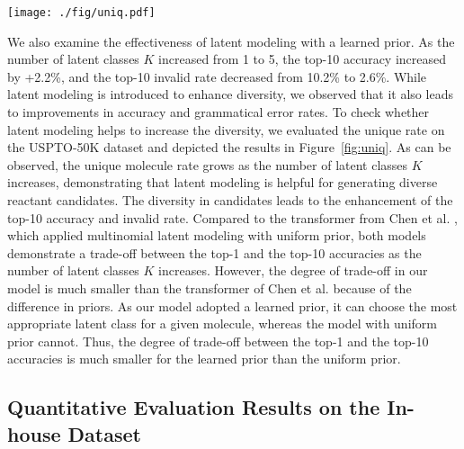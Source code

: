 \documentclass[journal=jacsat,manuscript=article]{achemso}
\begin{document}
	\begin{figure*}
	\centering
	\texttt{[image: ./fig/uniq.pdf]}
	\caption{Unique rate evaluation on the USPTO-50K dataset (unit: \%).}
	\label{fig:uniq}
	\end{figure*}
	
	We also examine the effectiveness of latent modeling with a learned prior. As the number of latent classes $K$ increased from 1 to 5, the top-10 accuracy increased by +2.2\%, and the top-10 invalid rate decreased from 10.2\% to 2.6\%. While latent modeling is introduced to enhance diversity, we observed that it also leads to improvements in accuracy and grammatical error rates. To check whether latent modeling helps to increase the diversity, we evaluated the unique rate on the USPTO-50K dataset and depicted the results in Figure~\ref{fig:uniq}. As can be observed, the unique molecule rate grows as the number of latent classes $K$ increases, demonstrating that latent modeling is helpful for generating diverse reactant candidates. The diversity in candidates leads to the enhancement of the top-10 accuracy and invalid rate. Compared to the transformer from Chen et al. \cite{chen2019learning}, which applied multinomial latent modeling with uniform prior, both models demonstrate a trade-off between the top-1 and the top-10 accuracies as the number of latent classes $K$ increases. However, the degree of trade-off in our model is much smaller than the transformer of Chen et al. because of the difference in priors. As our model adopted a learned prior, it can choose the most appropriate latent class for a given molecule, whereas the model with uniform prior cannot. Thus, the degree of trade-off between the top-1 and the top-10 accuracies is much smaller for the learned prior than the uniform prior.
	

	\subsection{Quantitative Evaluation Results on the In-house Dataset}
	
\end{document}

